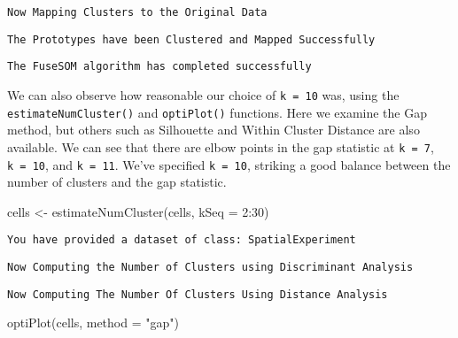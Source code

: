 \documentclass[
  letterpaper,
  DIV=11,
  numbers=noendperiod]{scrreprt}
\newenvironment{Shaded}{\begin{snugshade}}{\end{snugshade}}
\newcommand{\AttributeTok}[1]{\textcolor[rgb]{0.40,0.45,0.13}{#1}}
\newcommand{\DecValTok}[1]{\textcolor[rgb]{0.68,0.00,0.00}{#1}}
\newcommand{\FunctionTok}[1]{\textcolor[rgb]{0.28,0.35,0.67}{#1}}
\newcommand{\NormalTok}[1]{\textcolor[rgb]{0.00,0.23,0.31}{#1}}
\newcommand{\OtherTok}[1]{\textcolor[rgb]{0.00,0.23,0.31}{#1}}
\newcommand{\SpecialCharTok}[1]{\textcolor[rgb]{0.37,0.37,0.37}{#1}}
\newcommand{\StringTok}[1]{\textcolor[rgb]{0.13,0.47,0.30}{#1}}
\begin{document}
\begin{verbatim}
Now Mapping Clusters to the Original Data
\end{verbatim}

\begin{verbatim}
The Prototypes have been Clustered and Mapped Successfully
\end{verbatim}

\begin{verbatim}
The FuseSOM algorithm has completed successfully
\end{verbatim}

We can also observe how reasonable our choice of \texttt{k\ =\ 10} was,
using the \texttt{estimateNumCluster()} and \texttt{optiPlot()}
functions. Here we examine the Gap method, but others such as Silhouette
and Within Cluster Distance are also available. We can see that there
are elbow points in the gap statistic at \texttt{k\ =\ 7},
\texttt{k\ =\ 10}, and \texttt{k\ =\ 11}. We've specified
\texttt{k\ =\ 10}, striking a good balance between the number of
clusters and the gap statistic.

\begin{Shaded}
\begin{Highlighting}[]
\NormalTok{cells }\OtherTok{\textless{}{-}} \FunctionTok{estimateNumCluster}\NormalTok{(cells, }\AttributeTok{kSeq =} \DecValTok{2}\SpecialCharTok{:}\DecValTok{30}\NormalTok{)}
\end{Highlighting}
\end{Shaded}

\begin{verbatim}
You have provided a dataset of class: SpatialExperiment
\end{verbatim}

\begin{verbatim}
Now Computing the Number of Clusters using Discriminant Analysis
\end{verbatim}

\begin{verbatim}
Now Computing The Number Of Clusters Using Distance Analysis
\end{verbatim}

\begin{Shaded}
\begin{Highlighting}[]
\FunctionTok{optiPlot}\NormalTok{(cells, }\AttributeTok{method =} \StringTok{"gap"}\NormalTok{)}
\end{Highlighting}
\end{Shaded}
\end{document}
